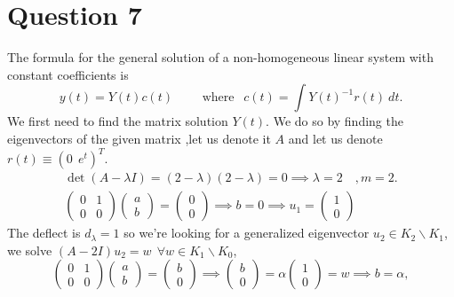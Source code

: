\documentclass[
	12pt,
	]{article}
\theoremstyle{definition}
\theoremstyle{definition}
\theoremstyle{definition}
\theoremstyle{definition}
\theoremstyle{definition}
\theoremstyle{example}
\theoremstyle{note}
\theoremstyle{remark}
\theoremstyle{example}
\begin{document}
			\section*{Question 7}
				The formula for the general solution of a non-homogeneous linear system with constant coefficients is 
				\begin{equation} 
				 y(t) = Y(t)c(t)\qquad \text{ where } \ \ c(t) = \int Y(t)^{-1}r(t) \ dt.
				 \end{equation}
				We first need to find the matrix solution $Y(t)$. We do so by finding the eigenvectors of the given matrix ,let us denote it $A$ and let us denote $r(t) \equiv (0 \ \ e^{t})^{T}.$
				\begin{gather*}
					\det(A - \lambda I ) = (2-\lambda)(2-\lambda) = 0 \implies \lambda = 2 \quad, m=2.\\
					\begin{pmatrix}
					0 & 1 \\ 0 & 0 
					\end{pmatrix}
					\begin{pmatrix}
						a \\ b 
					\end{pmatrix} = \begin{pmatrix}
					0 \\ 0
					\end{pmatrix} \implies b =0 \implies u_{1} = \begin{pmatrix}
						1 \\ 0
					\end{pmatrix}
				\end{gather*} 
				The deflect is $d_{\lambda} =1$ so we're looking for a generalized eigenvector $u_{2} \in K_{2} \backslash K_{1}$, we solve $(A-2I)u_{2} = w \ \ \forall w \in K_{1} \backslash K_{0}$, 
					$$\begin{pmatrix}
					0 & 1 \\ 0 & 0 
					\end{pmatrix}
					\begin{pmatrix}
						a \\ b 
					\end{pmatrix} = \begin{pmatrix}
					b \\ 0
					\end{pmatrix} \implies \begin{pmatrix}
						b \\ 0
					\end{pmatrix} = \alpha \begin{pmatrix}
						1 \\ 0
					\end{pmatrix} = w \implies b = \alpha ,$$
\end{document}
